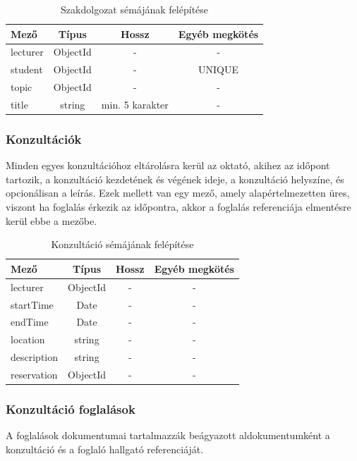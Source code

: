 \documentclass[
]{thesis-ekf}
\theoremstyle{definition}
\theoremstyle{remark}
\begin{document}
	\begin{table}[!h]
		\centering
		\begin{tabular}{|l|c|c|c|} 
			\hline
			\textbf{Mező} & \textbf{Típus} & \textbf{Hossz} & \textbf{Egyéb megkötés} \\ 
			\hline
			lecturer & ObjectId & - & - \\ 
			\hline
			student & ObjectId & - & UNIQUE \\ 
			\hline
			topic & ObjectId & - & - \\ 
			\hline
			title & string & min. 5 karakter & - \\
			\hline
		\end{tabular}
		\caption{Szakdolgozat sémájának felépítése}
		\label{tbl:szakdoga_dokumentum}
	\end{table}
	
	\subsubsection{Konzultációk}
	Minden egyes konzultációhoz eltárolásra kerül az oktató, akihez az időpont tartozik, a konzultáció kezdetének és végének ideje, a konzultáció helyszíne, és opcionálisan a leírás. Ezek mellett van egy mező, amely alapértelmezetten üres, viszont ha foglalás érkezik az időpontra, akkor a foglalás referenciája elmentésre kerül ebbe a mezőbe.
	
	\begin{table}[!h]
		\centering
		\begin{tabular}{|l|c|c|c|} 
			\hline
			\textbf{Mező} & \textbf{Típus} & \textbf{Hossz} & \textbf{Egyéb megkötés} \\ 
			\hline
			lecturer & ObjectId & - & - \\ 
			\hline
			startTime & Date & - & - \\ 
			\hline
			endTime & Date & - & - \\ 
			\hline
			location & string & - & - \\ 
			\hline
			description & string & - & - \\ 
			\hline
			reservation & ObjectId & - & - \\
			\hline
		\end{tabular}
		\caption{Konzultáció sémájának felépítése}
		\label{tbl:konzultacio_dokumentum}
	\end{table}
	
	\subsubsection{Konzultáció foglalások}
	A foglalások dokumentumai tartalmazzák beágyazott aldokumentumként a konzultáció és a foglaló hallgató referenciáját.
	
\end{document}
